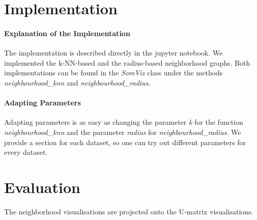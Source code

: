 \documentclass[12pt]{article}
\begin{document}
\maketitle

\section{Implementation}
\paragraph*{Explanation of the Implementation}
The implementation is described directly in the jupyter notebook.
We implemented the k-NN-based and the radius-based neighborhood graphs.
Both implementations can be found in the \textit{SomViz} class under the methods \textit{neighbourhood\_knn} and \textit{neighbourhood\_radius}.

\paragraph*{Adapting Parameters}
Adapting parameters is as easy as changing the parameter \textit{k} for the function \textit{neighbourhood\_knn} and the parameter \textit{radius} for \textit{neighbourhood\_radius}.
We provide a section for each dataset, so one can try out different parameters for every dataset.

\section{Evaluation}
The neighborhood visualisations are projected onto the U-matrix visualisations.
\end{document}

